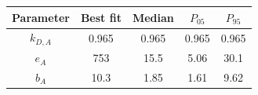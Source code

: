\begin{tabular}{ccccc}
\toprule
Parameter & Best fit & Median & $P_{05}$ & $P_{95}$\\
\midrule
$k_{D,A}$ & 0.965 & 0.965 & 0.965 & 0.965\\
$e_A$ & 753 & 15.5 & 5.06 & 30.1\\
$b_A$ & 10.3 & 1.85 & 1.61 & 9.62\\
\bottomrule
\end{tabular}
